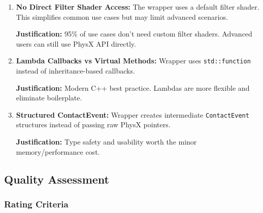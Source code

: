 \begin{enumerate}
    \item \textbf{No Direct Filter Shader Access:} The wrapper uses a default filter shader. This simplifies common use cases but may limit advanced scenarios.

    \textbf{Justification:} 95\% of use cases don't need custom filter shaders. Advanced users can still use PhysX API directly.

    \item \textbf{Lambda Callbacks vs Virtual Methods:} Wrapper uses \texttt{std::function} instead of inheritance-based callbacks.

    \textbf{Justification:} Modern C++ best practice. Lambdas are more flexible and eliminate boilerplate.

    \item \textbf{Structured ContactEvent:} Wrapper creates intermediate \texttt{ContactEvent} structures instead of passing raw PhysX pointers.

    \textbf{Justification:} Type safety and usability worth the minor memory/performance cost.
\end{enumerate}


\subsection{Quality Assessment}

\subsubsection{Rating Criteria}

